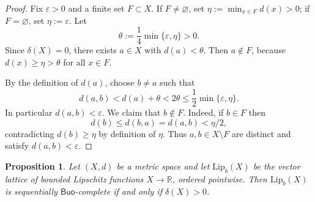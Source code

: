 \documentclass[11pt]{amsart}
\newtheorem{proposition}[theorem]{Proposition}
\theoremstyle{definition}
\newcommand{\R}{\mathbb{R}}
\newcommand{\Buo}{\ensuremath{\mathsf{Buo}}}
\renewcommand{\le}{\leqslant}
\renewcommand{\ge}{\geqslant}
\begin{document}
\begin{proof}
Fix $\varepsilon>0$ and a finite set $F\subset X$.
If $F\neq\varnothing$, set $\eta:=\min_{x\in F} d(x)>0$; if $F=\varnothing$, set $\eta:=\varepsilon$.
Let
\[
\theta:=\frac14\min\{\varepsilon,\eta\}>0.
\]
Since $\delta(X)=0$, there exists $a\in X$ with $d(a)<\theta$.
Then $a\notin F$, because $d(x)\ge\eta>\theta$ for all $x\in F$.

By the definition of $d(a)$, choose $b\neq a$ such that
\[
d(a,b)<d(a)+\theta<2\theta\le \frac12\min\{\varepsilon,\eta\}.
\]
In particular $d(a,b)<\varepsilon$. We claim that $b\notin F$.
Indeed, if $b\in F$ then
\[
d(b)\le d(b,a)=d(a,b)<\eta/2,
\]
contradicting $d(b)\ge \eta$ by definition of $\eta$.
Thus $a,b\in X\setminus F$ are distinct and satisfy $d(a,b)<\varepsilon$.
\end{proof}

\begin{proposition}\label{prop:Lipb-uniformly-discrete}
Let $(X,d)$ be a metric space and let $\mathrm{Lip}_b(X)$ be the vector lattice of bounded
Lipschitz functions $X\to\R$, ordered pointwise. Then $\mathrm{Lip}_b(X)$ is sequentially
\Buo-complete if and only if $\delta(X)>0$.
\end{proposition}
\end{document}
